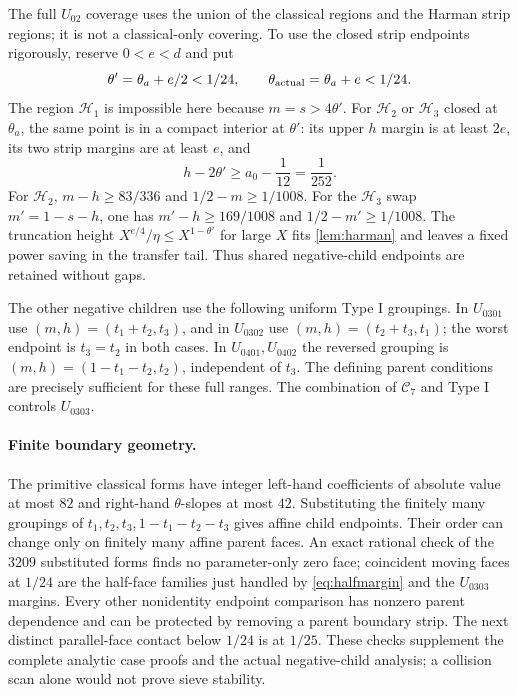 The full $U_{02}$ coverage uses the union of the classical regions
and the Harman strip regions; it is not a classical-only covering.
To use the closed strip endpoints rigorously, reserve $0<e<d$ and put
\[
 \theta'=\theta_a+e/2<1/24,\qquad
 \theta_{\rm actual}=\theta_a+e<1/24.
\]
The region $\mathcal H_1$ is impossible here because $m=s>4\theta'$.
For $\mathcal H_2$ or $\mathcal H_3$ closed at $\theta_a$, the same
point is in a compact interior at $\theta'$: its upper $h$ margin
is at least $2e$, its two strip margins are at least $e$, and
\[
 h-2\theta'\ge a_0-\frac1{12}=\frac1{252}.
\]
For $\mathcal H_2$, $m-h\ge83/336$ and $1/2-m\ge1/1008$.
For the $\mathcal H_3$ swap $m'=1-s-h$, one has
$m'-h\ge169/1008$ and $1/2-m'\ge1/1008$.
The truncation height $X^{e/4}/\eta\le X^{1-\theta'}$ for large $X$ fits
\cref{lem:harman} and leaves a fixed power saving in the transfer
tail. Thus shared negative-child endpoints are retained without gaps.

The other negative children use the following uniform Type I
groupings. In $U_{0301}$ use $(m,h)=(t_1+t_2,t_3)$, and in
$U_{0302}$ use $(m,h)=(t_2+t_3,t_1)$; the worst endpoint is
$t_3=t_2$ in both cases. In $U_{0401},U_{0402}$ the reversed
grouping is $(m,h)=(1-t_1-t_2,t_2)$, independent of $t_3$.
The defining parent conditions are precisely sufficient for these
full ranges. The combination of $\mathcal C_7$ and Type I controls
$U_{0303}$.

\paragraph{Finite boundary geometry.}
The primitive classical forms have integer left-hand coefficients
of absolute value at most $82$ and right-hand $\theta$-slopes at
most $42$. Substituting the finitely many groupings of
$t_1,t_2,t_3,1-t_1-t_2-t_3$ gives affine child endpoints.
Their order can change only on finitely many affine parent faces.
An exact rational check of the $3209$ substituted forms finds no
parameter-only zero face; coincident moving faces at $1/24$ are
the half-face families just handled by \eqref{eq:halfmargin} and
the $U_{0303}$ margins.
Every other nonidentity endpoint comparison has nonzero parent
dependence and can be protected by removing a parent boundary strip.
The next distinct parallel-face contact below $1/24$ is at $1/25$.
These checks supplement the complete analytic case proofs and the
actual negative-child analysis; a collision scan alone would not
prove sieve stability.

